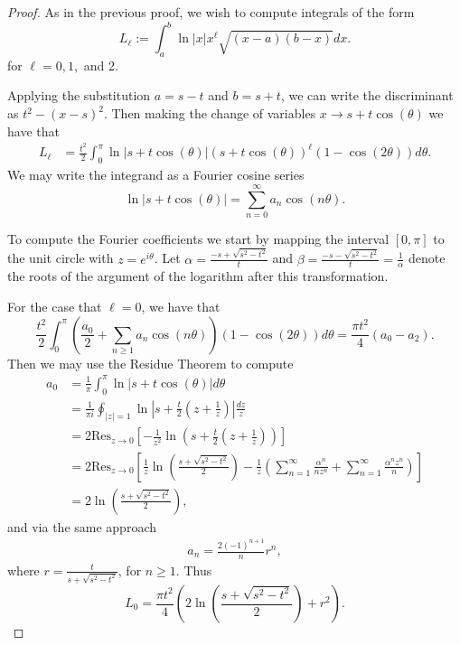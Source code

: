 \documentclass[10pt,a4paper]{amsart}
\begin{document}
\begin{proof}
As in the previous proof, we wish to compute integrals of the form 
\begin{equation*}
 L_{\ell}:= \int_{a}^{b} \ln|x| x^\ell \sqrt{(x-a)(b-x)}dx.
\end{equation*}
for $\ell = 0,1,$ and 2. 


Applying the substitution $a=s-t$ and $b= s+t$, we can write the discriminant as $t^2 - (x-s)^2$. Then making the change of variables $x \rightarrow s+t\cos (\theta)$ we have that
\begin{align*}
 L_{\ell}
 &=\frac{t^2}{2}\int_{0}^{\pi} \ln|s+t\cos (\theta)| (s+t\cos (\theta))^\ell \left(1-\cos(2 \theta)\right) d \theta.
\end{align*}
We may write the integrand as a Fourier cosine series 
\begin{equation*}
 \ln|s+ t \cos(\theta)| =  \sum_{n=0}^{\infty} a_{n}\cos( n \theta).
\end{equation*}



To compute the Fourier coefficients we start by mapping the interval $[0,\pi]$ to the unit circle with $z = e^{i\theta}$. Let $\alpha = \frac{-s+\sqrt{s^2-t^2}}{t}$ and $\beta = \frac{-s-\sqrt{s^2-t^2}}{t}= \frac{1}{\alpha}$ denote the roots of the argument of the logarithm after this transformation. 

For the case that $\ell=0$, we have that 
$$
 \frac{t^2}{2}\int_0^\pi\left(\frac{a_0}{2}+\sum_{n \geq 1} a_n \cos (n \theta)\right)\left(1-\cos (2 \theta)\right) d \theta= \frac{\pi t^2}{4}\left(a_0-a_2\right).
$$
Then we may use the Residue Theorem to compute
\begin{align*}
 a_{0} &= \frac{1}{\pi}\int_{0}^{\pi}\ln|s+t \cos(\theta)|d\theta \\
 &=\frac{1}{\pi i} \oint_{|z|=1}\ln\left| s+ \frac{t}{2}\left(z+\frac{1}{z} \right)\right|\frac{dz}{z}\\
 &=2\text{Res}_{z\rightarrow 0}\left[-\frac{1}{z^2}\ln\left( s+ \frac{t}{2}\left(z+\frac{1}{z} \right)\right)\right]\\
 &= 2 \text{Res}_{z\rightarrow 0}\left[\frac{1}{z}\ln \left(\frac{s+\sqrt{s^2-t^2}}{2}\right)-\frac{1}{z}\left(\sum_{n=1}^{\infty} \frac{\alpha^n}{n z^n}+\sum_{n=1}^{\infty} \frac{\alpha^n z^n}{n} \right)\right]\\
 &= 2\ln \left(\frac{s+\sqrt{s^2-t^2}}{2}\right),
\end{align*}
and via the same approach
\begin{align*}
 a_{n} = \frac{2(-1)^{n+1}}{n} r^{n},
\end{align*}
where $r = \frac{t}{s + \sqrt{s^2 -t^2}}$, for $n\geq 1$. Thus
\begin{equation*}
 L_{0} = \frac{\pi t^2}{4} \left( 2\ln \left(\frac{s+\sqrt{s^2-t^2}}{2}\right) +r^2 \right).
\end{equation*}



\end{proof}
\end{document}
